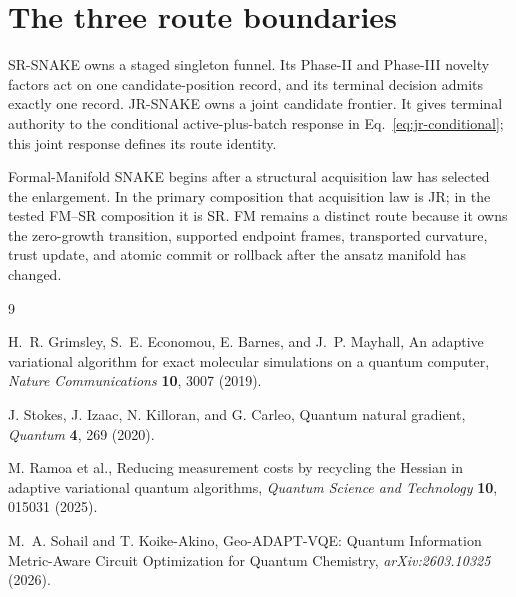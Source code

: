 \documentclass[10pt,twocolumn]{article}
\begin{document}
\section*{The three route boundaries}

SR-SNAKE owns a staged singleton funnel. Its Phase-II and Phase-III novelty
factors act on one candidate-position record, and its terminal decision admits
exactly one record. JR-SNAKE owns a joint candidate frontier. It gives terminal
authority to the conditional active-plus-batch response in
Eq.~\eqref{eq:jr-conditional}; this joint response defines its route identity.

Formal-Manifold SNAKE begins after a structural acquisition law has selected
the enlargement. In the primary composition that acquisition law is JR; in
the tested FM--SR composition it is SR. FM remains a distinct route because it
owns the zero-growth transition, supported endpoint frames, transported
curvature, trust update, and atomic commit or rollback after the ansatz manifold
has changed.

\footnotesize
\begin{thebibliography}{9}

H.~R. Grimsley, S.~E. Economou, E. Barnes, and J.~P. Mayhall,
An adaptive variational algorithm for exact molecular simulations on a
quantum computer, \emph{Nature Communications} \textbf{10}, 3007 (2019).

J. Stokes, J. Izaac, N. Killoran, and G. Carleo,
Quantum natural gradient, \emph{Quantum} \textbf{4}, 269 (2020).

M. Ramoa et al., Reducing measurement costs by recycling the Hessian in
adaptive variational quantum algorithms, \emph{Quantum Science and
Technology} \textbf{10}, 015031 (2025).

M.~A. Sohail and T. Koike-Akino, Geo-ADAPT-VQE: Quantum Information
Metric-Aware Circuit Optimization for Quantum Chemistry,
\emph{arXiv:2603.10325} (2026).

\end{thebibliography}
\end{document}
